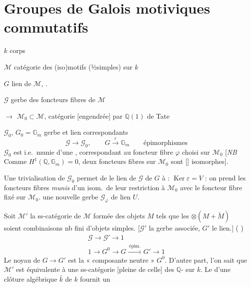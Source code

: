 \documentclass[11pt,a4paper]{article}
\begin{document}
\section{Groupes de Galois motiviques commutatifs}


$k$ corps

$\mathcal{M}$ catégorie des (iso)motifs (½simples) sur $k$

$G$ lien de $\mathcal{M}$, .

$\mathcal{G}$ gerbe des \struck{\ill{}} foncteurs fibres de $\mathcal{M}$


 $\to$ $\mathcal{M}_{0} \subset \mathcal{M}$,
catégorie  [engendrée] par $\mathbb{Q}(1)$ de Tate

$\mathcal{G}_{0}$, $G_{0} = \mathbb{G}_{m}$ gerbe et lien correspondants
\[
  \mathcal{G} \to \mathcal{G}_{0} ,
  \qquad
  G \xrightarrow{\;\varepsilon\;} \mathbb{G}_{m}
  \qquad \text{épimorphismes}
\]
$\mathcal{G}_{0}$ est  i.e.\ munie d'une
, correspondant au foncteur fibre $\varphi$
 choisi sur $\mathcal{M}_{0}$ [\emph{NB}
Comme $H^{1}(\mathbb{Q}, \mathbb{G}_{m}) = 0$, deux foncteurs fibres sur
$\mathcal{M}_{0}$ sont [\ill{}] isomorphes].

Une trivialisation de $\mathcal{G}_{0}$ permet de  le
lien de $\mathcal{G}$ de $G$ à : $\operatorname{Ker}\varepsilon = V$ : on
prend les foncteurs fibres \emph{munis} d'un isom.\ de leur restriction à
$\mathcal{M}_{0}$ avec le foncteur fibre fixé sur $\mathcal{M}_{0}$.
 \ill{} une nouvelle gerbe $\mathcal{G}_{\varphi}$ de lien
$U$.

Soit $\mathcal{M}'$ la ss-catégorie de $\mathcal{M}$ formée des objets $M$
tels que les $\otimes(M + \check{M})$ soient combinaisons  nb
fini d'objets simples. [$\mathcal{G}'$ la gerbe associée, $G'$ le lien.]
(\ill{} \ill{} \ill{})
\[
  \begin{array}{l}
    \mathcal{G} \longrightarrow \mathcal{G}' \longrightarrow 1 \\[2pt]
    1 \longrightarrow G^{0} \longrightarrow G
      \xrightarrow{\ \text{épim.}\ } G' \longrightarrow 1
  \end{array}
\]
Le noyau de $G \to G'$ est la « composante neutre » $G^{0}$. D'autre part,
l'on sait que $\mathcal{M}'$ est équivalente à une ss-catégorie [pleine de
celle] des $\mathbb{Q}$-  sur $k$. Le
 d'une clôture algébrique $\bar{k}$ de $k$ fournit un
\end{document}
